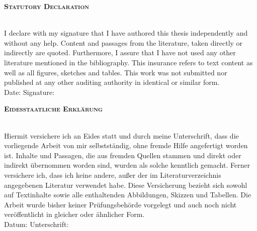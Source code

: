 
\begin{center}
\large \textsc{\textbf{Statutory Declaration}} \\
~\\ %



\end{center}

I declare with my signature that I have authored this thesis independently and without any help. Content and passages from the literature, taken directly or indirectly are quoted. Furthermore, I assure that I have not used any other literature mentioned in the bibliography. This insurance refers to text content as well as all figures, sketches and tables. This work was not submitted nor published at any other auditing authority in identical or similar form.
\\[1.5cm]
Date:	\hrulefill\enspace Signature: \hrulefill
\\[3.5cm]


\begin{center}
\large \textsc{ \textbf{Eidesstaatliche Erkl\"arung} } \\
~\\ %
\end{center}

Hiermit versichere ich an Eides statt und durch meine Unterschrift, dass die vorliegende Arbeit von mir selbstständig, ohne fremde Hilfe angefertigt worden ist. Inhalte und Passagen, die aus fremden Quellen stammen und direkt oder indirekt übernommen worden sind, wurden als solche kenntlich gemacht. Ferner versichere ich, dass ich keine andere, außer der im Literaturverzeichnis angegebenen Literatur verwendet habe. Diese Versicherung bezieht sich sowohl auf Textinhalte sowie alle enthaltenden Abbildungen, Skizzen und Tabellen. Die Arbeit wurde bisher keiner Prüfungsbehörde vorgelegt und auch noch nicht veröffentlicht in gleicher oder ähnlicher Form. 
\\[1.5cm]
Datum:	\hrulefill\enspace Unterschrift: \hrulefill
\\[3.5cm]
